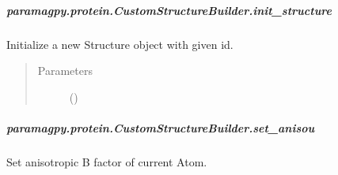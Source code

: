 \documentclass[a4paper,10pt,english,openany,oneside]{sphinxmanual}
\begin{document}
\begin{fulllineitems}
\begin{fulllineitems}
\begin{fulllineitems}
\begin{quote}
\begin{description}
\end{description}\end{quote}

\end{fulllineitems}



\subparagraph{paramagpy.protein.CustomStructureBuilder.init\_structure}
\label{\detokenize{reference/generated/paramagpy.protein.CustomStructureBuilder.init_structure:paramagpy-protein-customstructurebuilder-init-structure}}\label{\detokenize{reference/generated/paramagpy.protein.CustomStructureBuilder.init_structure::doc}}

\begin{fulllineitems}
\label{\detokenize{reference/generated/paramagpy.protein.CustomStructureBuilder.init_structure:paramagpy.protein.CustomStructureBuilder.init_structure}}
Initialize a new Structure object with given id.
\begin{quote}\begin{description}
\item[{Parameters}] \leavevmode
{} (\sphinxstyleliteralemphasis{\sphinxupquote{-}}) \textendash{} 

\end{description}\end{quote}

\end{fulllineitems}



\subparagraph{paramagpy.protein.CustomStructureBuilder.set\_anisou}
\label{\detokenize{reference/generated/paramagpy.protein.CustomStructureBuilder.set_anisou:paramagpy-protein-customstructurebuilder-set-anisou}}\label{\detokenize{reference/generated/paramagpy.protein.CustomStructureBuilder.set_anisou::doc}}

\begin{fulllineitems}
\label{\detokenize{reference/generated/paramagpy.protein.CustomStructureBuilder.set_anisou:paramagpy.protein.CustomStructureBuilder.set_anisou}}
Set anisotropic B factor of current Atom.


\end{fulllineitems}
\end{fulllineitems}
\end{fulllineitems}
\end{document}
